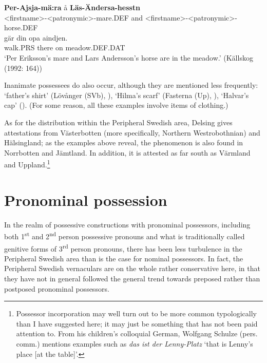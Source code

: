 
\ea\label{}
\gll \textbf{Per-Ajsja-mä:ra} å  \textbf{Läs-Ändersa-hesstn}\\
{\textless}firstname{\textgreater}-{\textless}patronymic{\textgreater}-mare.DEF  and  {\textless}firstname{\textgreater}-{\textless}patronymic{\textgreater}-horse.DEF\\
\gll gär  din  opa  aindjen.\\
walk.PRS  there  on  meadow.DEF.DAT\\
\glt ‘Per Eriksson’s mare and Lars Andersson’s horse are in the meadow.’ (Källskog (1992: 164))
\z

Inanimate possessees do also occur, although they are mentioned less frequently:  ‘father’s shirt’ (Lövånger (SVb), \citet{Holm1942}),  ‘Hilma’s scarf’ (Fasterna (Up), \citet[134]{Tiselius1902}),  ‘Halvar’s cap’ (\citet{Oscarsson2007}). (For some reason, all these examples involve items of clothing.)


As for the distribution within the Peripheral Swedish area, Delsing gives attestations from Västerbotten (more specifically, Northern Westrobothnian) and Hälsingland; as the examples above reveal, the phenomenon is also found in Norrbotten and Jämtland. In addition, it is attested as far south as Värmland and Uppland.\footnote{ Possessor incorporation may well turn out to be more common typologically than I have suggested here; it may just be something that has not been paid attention to. From his children’s colloquial German, Wolfgang Schulze (pers. comm.) mentions examples such as \textit{das ist der Lenny-Platz} ‘that is Lenny’s place [at the table]’.\par }


\section{Pronominal possession}

In the realm of possessive constructions with pronominal possessors, including both 1\textsuperscript{st} and 2\textsuperscript{nd} person possessive pronouns and what is traditionally called genitive forms of 3\textsuperscript{rd} person pronouns, there has been less turbulence in the Peripheral Swedish area than is the case for nominal possessors. In fact, the Peripheral Swedish vernaculars are on the whole rather conservative here, in that they have not in general followed the general trend towards preposed rather than postposed pronominal possessors. 

